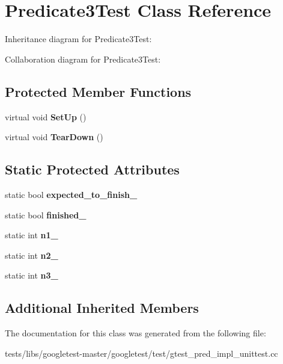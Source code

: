 \hypertarget{classPredicate3Test}{}\section{Predicate3\+Test Class Reference}
\label{classPredicate3Test}


Inheritance diagram for Predicate3\+Test\+:


Collaboration diagram for Predicate3\+Test\+:
\subsection*{Protected Member Functions}
\begin{DoxyCompactItemize}
\item 
\mbox{\label{classPredicate3Test_a92aad9566e0737b6739d1db14e7912be}} 
virtual void {\bfseries Set\+Up} ()
\item 
\mbox{\label{classPredicate3Test_aa4dc395bded849b6e5175566d791aba7}} 
virtual void {\bfseries Tear\+Down} ()
\end{DoxyCompactItemize}
\subsection*{Static Protected Attributes}
\begin{DoxyCompactItemize}
\item 
\mbox{\label{classPredicate3Test_a42c11555410ee89bf6e59d39336a212c}} 
static bool {\bfseries expected\+\_\+to\+\_\+finish\+\_\+}
\item 
\mbox{\label{classPredicate3Test_aa2ef0fa6aed09d872fb9ae36961b49eb}} 
static bool {\bfseries finished\+\_\+}
\item 
\mbox{\label{classPredicate3Test_ac232320a93f0c1e09886148a3e1929a5}} 
static int {\bfseries n1\+\_\+}
\item 
\mbox{\label{classPredicate3Test_a11049ef16bcaadc8262faf7349c7676e}} 
static int {\bfseries n2\+\_\+}
\item 
\mbox{\label{classPredicate3Test_afc1df6b079ffe22b87479b161d2ad2f7}} 
static int {\bfseries n3\+\_\+}
\end{DoxyCompactItemize}
\subsection*{Additional Inherited Members}


The documentation for this class was generated from the following file\+:\begin{DoxyCompactItemize}
\item 
tests/libs/googletest-\/master/googletest/test/gtest\+\_\+pred\+\_\+impl\+\_\+unittest.\+cc\end{DoxyCompactItemize}
